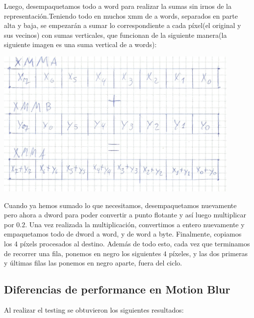 \documentclass[a4paper]{article}
\begin{document}
Luego, desempaquetamos todo a word para realizar la sumas sin irnos de la representación.Teniendo todo en muchos xmm de a words, separados en parte alta y baja, se empezarán a sumar lo correspondiente a cada píxel(el original y sus vecinos) con sumas verticales, que funcionan de la siguiente manera(la siguiente imagen es una suma vertical de a words):

\begin{center}
\includegraphics[width=0.9\textwidth]{Dibujos/sv.jpg}
\end{center}

Cuando ya hemos sumado lo que necesitamos, desempaquetamos nuevamente pero ahora a dword para poder convertir a punto flotante y así luego multiplicar por $0.2$. Una vez realizada la multiplicación, convertimos a entero nuevamente y empaquetamos todo de dword a word, y de word a byte. Finalmente, copiamos los 4 píxels procesados al destino. Además de todo esto, cada vez que terminamos de recorrer una fila, ponemos en negro los siguientes 4 píxeles, y las dos primeras y últimas filas las ponemos en negro aparte, fuera del ciclo.

\subsection{Diferencias de performance en Motion Blur}

Al realizar el testing se obtuvieron los siguientes resultados:

\end{document}
